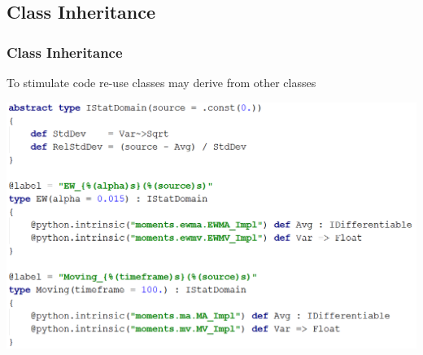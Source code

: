 \documentclass{beamer}
\begin{document}
\subsection{Class Inheritance}
\begin{frame}
\frametitle{Class Inheritance}
To stimulate code re-use classes may derive from other classes

\includegraphics[width=1\linewidth]{moments.png}
\end{frame}
\end{document}
